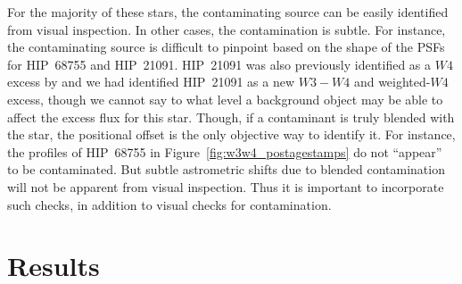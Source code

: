     
    
    For the majority of these stars, the contaminating source can be easily identified from visual inspection. In other cases, the contamination is subtle. For instance, the contaminating source is difficult to pinpoint based on the shape of the PSFs for HIP~68755 and HIP~21091. HIP~21091 was also previously identified as a $W4$ excess by \citet{Vican2014} and we had identified HIP~21091 as a new $W3-W4$ and weighted-$W4$ excess, though we cannot say to what level a background object may be able to affect the excess flux for this star. Though, if a contaminant is truly blended with the star, the positional offset is the only objective way to identify it. For instance, the profiles of HIP~68755 in Figure~\ref{fig:w3w4_postagestamps} do not ``appear'' to be contaminated. But subtle astrometric shifts due to blended contamination will not be apparent from visual inspection. Thus it is important to incorporate such checks, in addition to visual checks for contamination.
    
    
    

\section{Results}    
\label{sec:results}


